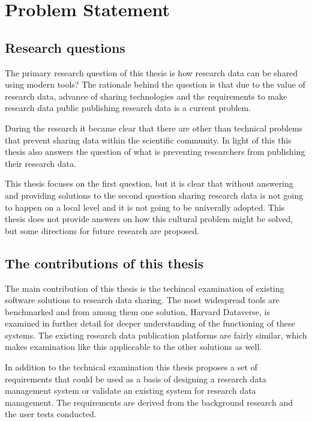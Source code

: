 \chapter{Problem Statement}
\label{chapter:problem}

\section{Research questions}

The primary research question of this thesis is how research data can be shared
using modern tools? The rationale behind the question is that due to the
value of research data, advance of sharing technologies and the requirements
to make research data public publishing research data is a current problem.

During the research it became clear that there are other than technical
problems that prevent sharing data within the scientific community. In light
of this this thesis also answers the question of what is preventing researchers
from publishing their research data.

This thesis focuses on the first question, but it is
clear that without answering and providing solutions to the second question
sharing research data is not going to happen on a local level and it is not
going to be univerally adopted. This thesis does not provide answers on how
this cultural problem might be solved, but some directions for future
research are proposed.

\section{The contributions of this thesis}

The main contribution of this thesis is the techincal examination of existing
software solutions to research data sharing. The most widespread tools are
benchmarked and from among them one solution, Harvard Dataverse, is examined
in further detail for deeper understanding of the functioning of these systems.
The existing research data publication platforms are fairly similar, which
makes examination like this appliccable to the other solutions as well.

In addition to the technical examination this thesis proposes a set of
requirements that could be used as a basis of designing a research data
management system or validate an existing system for research data management.
The requirements are derived from the background research and the user tests
conducted.

